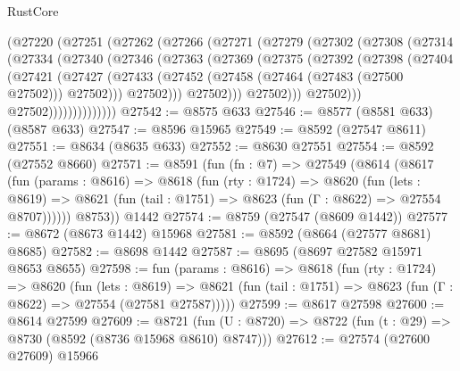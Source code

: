 \begin{lexlean}{RustCore}
\begin{coremodule}
                (@27220
                  (@27251
                    (@27262
                      (@27266
                        (@27271
                          (@27279
                            (@27302
                              (@27308
                                (@27314
                                  (@27334
                                    (@27340
                                      (@27346
                                        (@27363
                                          (@27369
                                            (@27375
                                              (@27392
                                                (@27398
                                                  (@27404
                                                    (@27421
                                                      (@27427
                                                        (@27433
                                                          (@27452
                                                            (@27458
                                                              (@27464 (@27483 (@27500 @27502)))
                                                              @27502)))
                                                        @27502)))
                                                  @27502)))
                                            @27502)))
                                      @27502)))
                                @27502))))))))))))))
@27542 := @8575 @633
@27546 := @8577 (@8581 @633) (@8587 @633)
@27547 := @8596 @15965
@27549 := @8592 (@27547 @8611)
@27551 := @8634 (@8635 @633)
@27552 := @8630 @27551
@27554 := @8592 (@27552 @8660)
@27571 := @8591
    (fun (fn : @7) =>
    @27549
      (@8614
        (@8617
          (fun (params : @8616) =>
          @8618
            (fun (rty : @1724) =>
            @8620
              (fun (lets : @8619) =>
              @8621 (fun (tail : @1751) => @8623 (fun (Γ : @8622) => @27554 @8707))))))
        @8753))
    @1442
@27574 := @8759 (@27547 (@8609 @1442))
@27577 := @8672 (@8673 @1442) @15968
@27581 := @8592 (@8664 (@27577 @8681) @8685)
@27582 := @8698 @1442
@27587 := @8695 (@8697 @27582 @15971 @8653 @8655)
@27598 := fun (params : @8616) =>
  @8618
    (fun (rty : @1724) =>
    @8620
      (fun (lets : @8619) =>
      @8621 (fun (tail : @1751) => @8623 (fun (Γ : @8622) => @27554 (@27581 @27587)))))
@27599 := @8617 @27598
@27600 := @8614 @27599
@27609 := @8721
    (fun (U : @8720) => @8722 (fun (t : @29) => @8730 (@8592 (@8736 @15968 @8610) @8747)))
@27612 := @27574 (@27600 @27609) @15966

\end{coremodule}
\end{lexlean}
